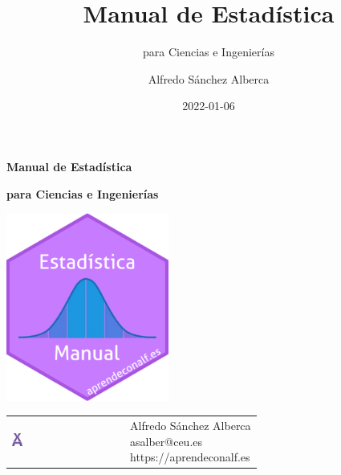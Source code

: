 \documentclass[
  a4paper,
]{scrreport}
\title{Manual de Estadística}
\subtitle{para Ciencias e Ingenierías}
\author{Alfredo Sánchez Alberca}
\date{2022-01-06}
\theoremstyle{plain}
\theoremstyle{definition}
\theoremstyle{definition}
\theoremstyle{remark}
\begin{document}
\begin{titlepage}

\begin{center}
\vspace*{5cm}

\Huge
{\textbf{\textsf{Manual de Estadística}}}

\vspace{0.5cm}
\LARGE
{\textbf{\textsf{para Ciencias e Ingenierías}}}

\vspace{1.5cm}

\includegraphics[width=0.4\textwidth]{img/logos/sticker.png}
\end{center}

\vfill

\begin{flushleft}
\begin{tabular}{ll}
\includegraphics[width=0.1\textwidth]{img/logos/aprendeconalf.png} & \parbox[b]{5cm}{\Large\textsf{Alfredo
Sánchez
Alberca}\\ \textsf{asalber@ceu.es} \\ \textsf{https://aprendeconalf.es}}
\end{tabular}
\end{flushleft}
\end{titlepage}\ifdefined\Shaded\renewenvironment{Shaded}{\begin{tcolorbox}[sharp corners, frame hidden, interior hidden, enhanced, borderline west={3pt}{0pt}{shadecolor}, boxrule=0pt, breakable]}{\end{tcolorbox}}\fi
\end{document}
